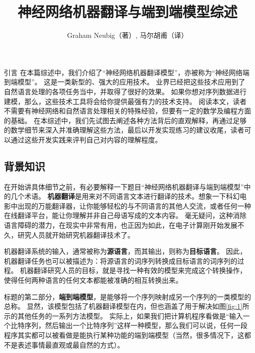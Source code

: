 \documentclass[10pt,a4paper]{ctexart}
\title{神经网络机器翻译与端到端模型综述}
\author{Graham Neubig（著）, 马尔胡甫（译）}
\date{}
\makeatletter
\renewcommand{\section}{\@startsection{section}{1}{0mm}
  {-\baselineskip}{0.5\baselineskip}{\bf\leftline}}
\makeatother
\begin{document}
\maketitle

\newpage

\tableofcontents

\newpage

\section{引言}
在本篇综述中，我们介绍了“神经网络机器翻译模型”，亦被称为“神经网络端到端模型”。
这是一类新型的、强大的应用技术。
业界已经把这些技术应用到了自然语言处理的各项任务当中，并取得了很好的效果。
如果你想对序列数据进行建模，那么，这些技术工具将会给你提供最强有力的技术支持。
阅读本文，读者不需要有神经网络和自然语言处理相关的特殊经验，但要有一定的数学及编程方面的基础。
在本综述中，我们先试图去阐述各种方法背后的直观解释，再通过足够的数学细节来深入并准确理解这些方法，最后以开发实现练习的建议收尾，读者可以通过这些开发实践来评判自己对内容的理解程度。

\subsection{背景知识}
在开始讲具体细节之前，有必要解释一下题目“神经网络机器翻译与端到端模型”中的几个术语。
\textbf{机器翻译}是用来对不同语言文本进行翻译的技术。想象一下科幻电影中出现的万能翻译器，让你能够轻松的与不同语言的其他人交流，或者任何一种在线翻译平台，能让你理解并非自己母语写成的文本内容。
毫无疑问，这种消除语言障碍的潜力，在现实中非常有用，也正因为如此，在电子计算刚开始发展不久，研究人员就开始研究机器翻译技术了。

机器翻译系统的输入，通常被称为\textbf{源语言}，而其输出，则称为\textbf{目标语言}。
因此，机器翻译任务也可以被描述为：将源语言的词序列转换成目标语言的词序列的过程。
机器翻译研究人员的目标，就是寻找一种有效的模型来完成这个转换操作，使得任何两种语言的任何文本都能被准确的相互转换出来。

标题的第二部分，\textbf{端到端模型}，是能够将一个序列映射成另一个序列的一类模型的总称。
显然，该模型包括了机器翻译模型在内，但也涵盖了用于解决如图\ref{fig:1}所示的其他任务的一系列方法模型。
实际上，如果我们把计算机程序看做是“输入一个比特序列，然后输出一个比特序列”这样一种模型，那么我们可以说，任何一段程序其实都可以被看做是能执行某种功能的端到端模型（当然，很多情况下，这都不是表述事情最直观或最自然的方式）。
\end{document}

